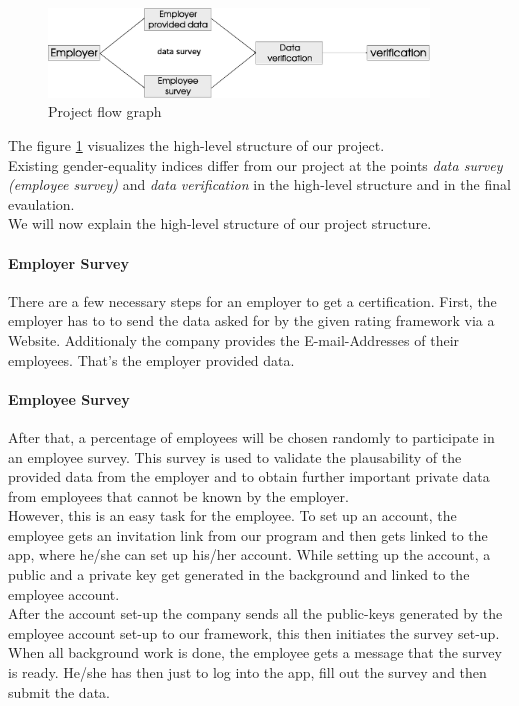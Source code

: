 \begin{figure}[H]
	\includegraphics[width=0.9\textwidth]{Bilder/bEquality-project-flow.eps}
	\caption{Project flow graph}
	\label{Project_flow_graph}
\end{figure}
The figure \ref{Project_flow_graph} visualizes the high-level structure of our project.\\
Existing gender-equality indices differ from our project at the points \textit{data survey (employee survey)} and \textit{data} \textit{verification} in the high-level structure and in the final evaulation.\\
We will now explain the high-level structure of our project structure.

\paragraph*{Employer Survey}
There are a few necessary steps for an employer to get a certification.
First, the employer has to to send the data asked for by the given rating framework via a Website. Additionaly the company provides the E-mail-Addresses of their employees. That’s the employer provided data.


\paragraph*{Employee Survey}
After that, a percentage of employees will be chosen randomly to participate in an employee survey. This survey is used to validate the plausability of the provided data from the employer and to obtain further important private data from employees that cannot be known by the employer.\\

However, this is an easy task for the employee. To set up an account, the employee gets an invitation link from our program and then gets linked to the app, where he/she can set up his/her account. While setting up the account, a public and a private key get generated in the background and linked to the employee account.\\
After the account set-up the company sends all the public-keys generated by the employee account set-up to our framework, this then initiates the survey set-up.\\
When all background work is done, the employee gets a message that the survey is ready. He/she has then just to log into the app, fill out the survey and then submit the data.\\


